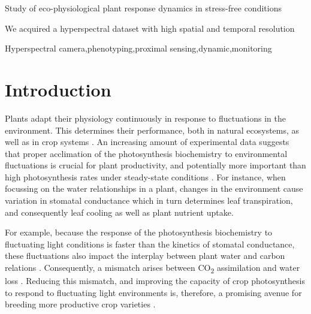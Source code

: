 \documentclass[10pt,authoryear,a4paper]{elsarticle}
\begin{document}
\begin{frontmatter}
    \begin{highlights}
        \item Study of eco-physiological plant response dynamics in stress-free conditions
        \item We acquired a hyperspectral dataset with high spatial and temporal resolution
    \end{highlights}
    
    \begin{keyword}
        Hyperspectral camera\sep phenotyping\sep proximal sensing\sep dynamic\sep monitoring 
    \end{keyword}

\end{frontmatter}


\section{Introduction}

    Plants adapt their physiology continuously in response to fluctuations in the environment. This determines their performance, both in natural ecosystems, as well as in crop systems \citep{schurrFunctional2006,arsovaDynamics2020}. An increasing amount of experimental data suggests that proper acclimation of the photosynthesis biochemistry to environmental fluctuations is crucial for plant productivity, and potentially more important than high photosynthesis rates under steady-state conditions \citep{kaiserFluctuating2018,kromdijkImproving2016,vialet-chabrandImportance2017,matthewsAcclimation2018,townsendSuboptimal2018}.
    For instance, when focussing on the water relationships in a plant, changes in the environment cause variation in stomatal conductance which in turn determines leaf transpiration, and consequently leaf cooling as well as plant nutrient uptake.
    
    For example, because the response of the photosynthesis biochemistry to fluctuating light conditions is faster than the kinetics of stomatal conductance, these fluctuations also impact the interplay between plant water and carbon relations \citep{lawsonImproving2012,lawsonStomatal2014}. Consequently, a mismatch arises between CO\textsubscript{2} assimilation and water loss \citep{mcauslandEffects2016}. Reducing this mismatch, and improving the capacity of crop photosynthesis to respond to fluctuating light environments is, therefore, a promising avenue for breeding more productive crop varieties \citep{salterRate2019,murchieDynamic2020}. 
    
\end{document}
